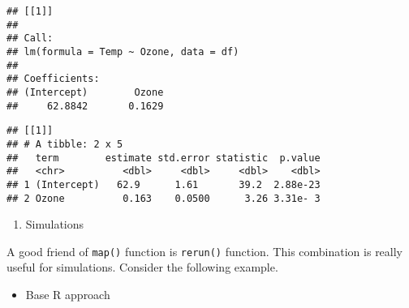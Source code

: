 \documentclass[
]{book}
\newenvironment{Shaded}{\begin{snugshade}}{\end{snugshade}}
\newcommand{\AttributeTok}[1]{\textcolor[rgb]{0.77,0.63,0.00}{#1}}
\newcommand{\CommentTok}[1]{\textcolor[rgb]{0.56,0.35,0.01}{\textit{#1}}}
\newcommand{\DecValTok}[1]{\textcolor[rgb]{0.00,0.00,0.81}{#1}}
\newcommand{\FunctionTok}[1]{\textcolor[rgb]{0.00,0.00,0.00}{#1}}
\newcommand{\NormalTok}[1]{#1}
\newcommand{\OtherTok}[1]{\textcolor[rgb]{0.56,0.35,0.01}{#1}}
\newcommand{\SpecialCharTok}[1]{\textcolor[rgb]{0.00,0.00,0.00}{#1}}
\providecommand{\tightlist}{%
  \setlength{\itemsep}{0pt}\setlength{\parskip}{0pt}}
\begin{document}
\begin{verbatim}
## [[1]]
## 
## Call:
## lm(formula = Temp ~ Ozone, data = df)
## 
## Coefficients:
## (Intercept)        Ozone  
##     62.8842       0.1629
\end{verbatim}

\begin{Shaded}
\end{Shaded}

\begin{verbatim}
## [[1]]
## # A tibble: 2 x 5
##   term        estimate std.error statistic  p.value
##   <chr>          <dbl>     <dbl>     <dbl>    <dbl>
## 1 (Intercept)   62.9      1.61       39.2  2.88e-23
## 2 Ozone          0.163    0.0500      3.26 3.31e- 3
\end{verbatim}

\begin{enumerate}
\def\labelenumi{\arabic{enumi}.}
\setcounter{enumi}{1}
\tightlist
\item
  Simulations
\end{enumerate}

A good friend of \texttt{map()} function is \texttt{rerun()} function. This combination is really useful for simulations. Consider the following example.

\begin{itemize}
\tightlist
\item
  Base R approach
\end{itemize}
\end{document}
